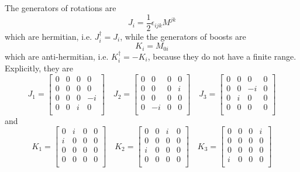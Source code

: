     The generators of rotations are
    \begin{equation*}
        J_i = \frac{1}{2} \epsilon_{ijk} M^{jk}
    \end{equation*}
    which are hermitian, i.e. $J_i^\dagger = J_i$, while the generators of boosts are
    \begin{equation*}
        K_i = M_{0i}
    \end{equation*}
    which are anti-hermitian, i.e. $K_i^\dagger = - K_i$, because they do not have a finite range. Explicitly, they are 
    \begin{equation}\label{explj}
        J_1 = \begin{bmatrix}
            0 & 0 & 0 & 0 \\ 
            0 & 0 & 0 & 0 \\ 
            0 & 0 & 0 & -i \\ 
            0 & 0 & i & 0 \\ 
        \end{bmatrix} \quad J_2 = \begin{bmatrix}
            0 & 0 & 0 & 0 \\ 
            0 & 0 & 0 & i \\ 
            0 & 0 & 0 & 0 \\ 
            0 & -i & 0 & 0 \\ 
        \end{bmatrix} \quad J_3 = \begin{bmatrix}
            0 & 0 & 0 & 0 \\ 
            0 & 0 & -i & 0 \\ 
            0 & i & 0 & 0 \\ 
            0 & 0 & 0 & 0 \\ 
        \end{bmatrix} 
    \end{equation}
    and 
    \begin{equation}\label{explk}
        K_1 = \begin{bmatrix}
            0 & i & 0 & 0 \\ 
            i & 0 & 0 & 0 \\ 
            0 & 0 & 0 & 0 \\ 
            0 & 0 & 0 & 0 \\ 
        \end{bmatrix} \quad K_2 = \begin{bmatrix}
            0 & 0 & i & 0 \\ 
            0 & 0 & 0 & 0 \\ 
            i & 0 & 0 & 0 \\ 
            0 & 0 & 0 & 0 \\ 
        \end{bmatrix} \quad K_3 = \begin{bmatrix}
            0 & 0 & 0 & i \\ 
            0 & 0 & 0 & 0 \\ 
            0 & 0 & 0 & 0 \\ 
            i & 0 & 0 & 0 \\ 
        \end{bmatrix} 
    \end{equation}

